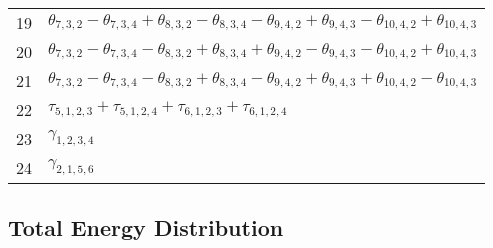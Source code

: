 \documentclass[10pt,oneside]{article}
\begin{document}
\begin{table}[h!]
\begin{tabular}{ll}
  19  & $\theta_{7,3,2} - \theta_{7,3,4} + \theta_{8,3,2} - \theta_{8,3,4} - \theta_{9,4,2} + \theta_{9,4,3} - \theta_{10,4,2} + \theta_{10,4,3}$ \\
  20  & $\theta_{7,3,2} - \theta_{7,3,4} - \theta_{8,3,2} + \theta_{8,3,4} + \theta_{9,4,2} - \theta_{9,4,3} - \theta_{10,4,2} + \theta_{10,4,3}$ \\
  21  & $\theta_{7,3,2} - \theta_{7,3,4} - \theta_{8,3,2} + \theta_{8,3,4} - \theta_{9,4,2} + \theta_{9,4,3} + \theta_{10,4,2} - \theta_{10,4,3}$ \\
  22  & $\tau_{5,1,2,3} + \tau_{5,1,2,4} + \tau_{6,1,2,3} + \tau_{6,1,2,4}$ \\
  23  & $\gamma_{1,2,3,4}$ \\
  24  & $\gamma_{2,1,5,6}$ \\
\bottomrule
\end{tabular}
\end{table}

\begin{table}
\subsection*{Total Energy Distribution}
\centering\end{table}

\clearpage

\subsection{}
\end{document}
